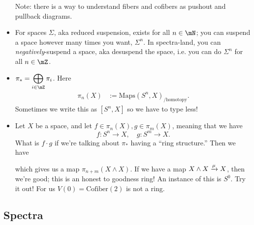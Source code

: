 \begin{itemize}
    Note: there is a way to understand fibers and cofibers as pushout and pullback diagrams. 
    \item For spaces $\Sigma$, aka reduced suspension, exists for all $n\in \mN$; you can suspend a space however many times you want, $\Sigma^n$. In spectra-land, you can \emph{negatively}-suspend a space, aka desuspend the space, i.e. you can do $\Sigma^n$ for all $n\in \mZ$. 
    \item $\ds\pi_\ast = \bigoplus_{i\in \mZ} \pi_i$. Here \begin{align*}
        \pi_n(X)&:=\text{Maps}(S^n,X)_{/\text{homotopy}}.
    \end{align*} Sometimes we write this as $[S^n,X]$ so we have to type less!
    \item Let $X$ be a space, and let $f\in \pi_n(X), g\in \pi_m(X)$, meaning that we have $$f:S^n\to X, \quad g:S^m\to X.$$ What is $f\cdot g$ if we're talking about $\pi_\ast$ having a ``ring structure.'' Then we have 
    \begin{center}
    \end{center}
    which gives us a map $\pi_{n+m}(X\wedge X)$. If we have a map $X\wedge X \xrightarrow{\mu} X$, then we're good; this is an honest to goodness ring! An instance of this is $S^0$. Try it out! For us $V(0) = \text{Cofiber}(2)$ is not a ring. 
\end{itemize}


\lineyspace

\subsection{Spectra}

